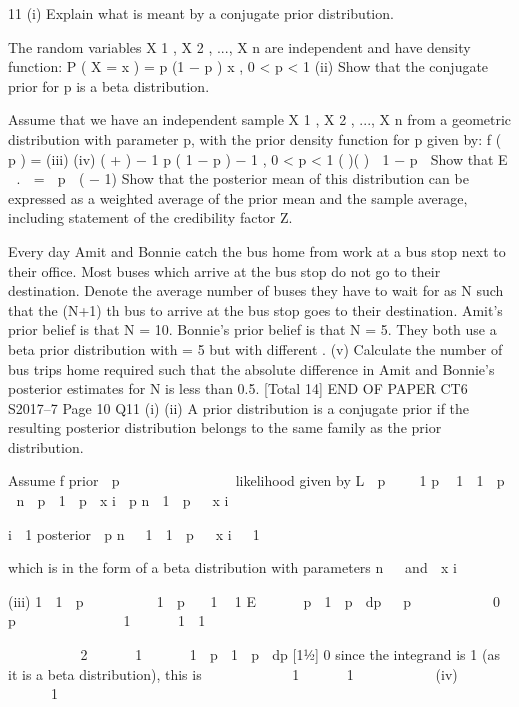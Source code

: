 \documentclass[a4paper,12pt]{article}
\begin{document}
\begin{enumerate}
11
(i)
Explain what is meant by a conjugate prior distribution.

The random variables X 1 , X 2 , ..., X n are independent and have density function:
P ( X = x ) = p (1 − p ) x , 0 < p < 1
(ii)
Show that the conjugate prior for p is a beta distribution.

Assume that we have an independent sample X 1 , X 2 , ..., X n from a geometric
distribution with parameter p, with the prior density function for p given by:
f ( p ) =
(iii)
(iv)
\gamma( \alpha  + \beta ) \alpha − 1
p ( 1 − p ) \beta− 1 , 0 < p < 1
\gamma( \alpha  )\gamma ( \beta )
 1 − p 
\beta
Show that E 
.
 =
 p  ( \alpha  − 1)
Show that the posterior mean of this distribution can be expressed as a
weighted average of the prior mean and the sample average, including
statement of the credibility factor Z.


Every day Amit and Bonnie catch the bus home from work at a bus stop next to their
office. Most buses which arrive at the bus stop do not go to their destination. Denote
the average number of buses they have to wait for as N such that the (N+1) th bus to
arrive at the bus stop goes to their destination. Amit’s prior belief is that N = 10.
Bonnie’s prior belief is that N = 5. They both use a beta prior distribution with \alpha  = 5
but with different \beta .
(v)
Calculate the number of bus trips home required such that the absolute
difference in Amit and Bonnie’s posterior estimates for N is less than 0.5. 
[Total 14]
END OF PAPER
CT6 S2017–7
Page 10 %
Q11
(i)
(ii)
A prior distribution is a conjugate prior if the resulting posterior distribution
belongs to the same family as the prior distribution.

Assume f prior  p  
\gamma     
\gamma    \gamma   
likelihood given by L  p  
 1
p  1  1  p 
n
 p  1  p 
x i
 p n  1  p 
 x i

i  1
posterior  p n  1  1  p 
 x i  1

which is in the form of a beta distribution with parameters n   and  x i  

(iii)
1
 1  p         1  p   1
 1
E 



 p  1  p  dp

 p          0  p 

          1      1  1
       
     

     

 2
     1      1  p  1  p  dp
[11⁄2]
0
since the integrand is 1 (as it is a beta distribution), this is
          1      1 
       
(iv)
     


   1 


\end{enumerate}
\end{document}
